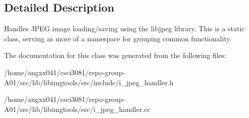 \subsection{Detailed Description}
Handles J\+P\+EG image loading/saving using the libjpeg library. This is a static class, serving as more of a namespace for grouping common functionality. 

The documentation for this class was generated from the following files\+:\begin{DoxyCompactItemize}
\item 
/home/angxx041/csci3081/repo-\/group-\/\+A01/src/lib/libimgtools/src/include/i\+\_\+jpeg\+\_\+handler.\+h\item 
/home/angxx041/csci3081/repo-\/group-\/\+A01/src/lib/libimgtools/src/i\+\_\+jpeg\+\_\+handler.\+cc\end{DoxyCompactItemize}
